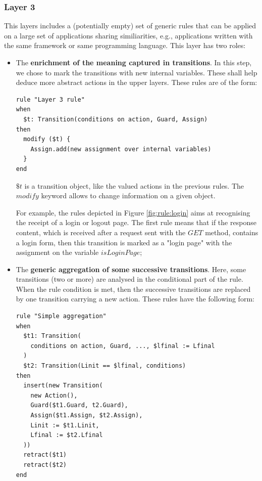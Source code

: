 \subsubsection{Layer 3}

This layers includes a (potentially empty) set of generic rules
that can be applied on a large set of applications sharing
similiarities, e.g., applications written with the same framework
or same programming language.  This layer has two roles:

\begin{itemize}
\item The \textbf{enrichment of the meaning captured in
    transitions}. In this step, we chose to mark the transitions
    with new internal variables. These shall help deduce more
    abstract actions in the upper layers. These rules are of the
    form:

\begin{BVerbatim}
rule "Layer 3 rule"
when
  $t: Transition(conditions on action, Guard, Assign)
then
  modify ($t) {
    Assign.add(new assignment over internal variables)
  }
end
\end{BVerbatim}

$\$t$ is a transition object, like the valued actions in the
previous rules. The $modify$ keyword allows to change information
on a given object.

For example, the rules depicted in Figure \ref{fig:rule:login}
aims at recognising the receipt of a login or logout page. The
first rule means that if the response content, which is received
after a request sent with the $GET$ method, contains a login
form, then this transition is marked as a "login page" with the
assignment on the variable $isLoginPage$;

\item The \textbf{generic aggregation of some successive
    transitions}. Here, some transitions (two or more) are
    analysed in the conditional part of the rule. When the rule
    condition is met, then the successive transitions are replaced
    by one transition carrying a new action. These rules have the
    following form:

\begin{verbatim}
rule "Simple aggregation"
when
  $t1: Transition(
    conditions on action, Guard, ..., $lfinal := Lfinal
  )
  $t2: Transition(Linit == $lfinal, conditions)
then
  insert(new Transition(
    new Action(),
    Guard($t1.Guard, t2.Guard),
    Assign($t1.Assign, $t2.Assign),
    Linit := $t1.Linit,
    Lfinal := $t2.Lfinal
  ))
  retract($t1)
  retract($t2)
end
\end{verbatim}


\end{itemize}
